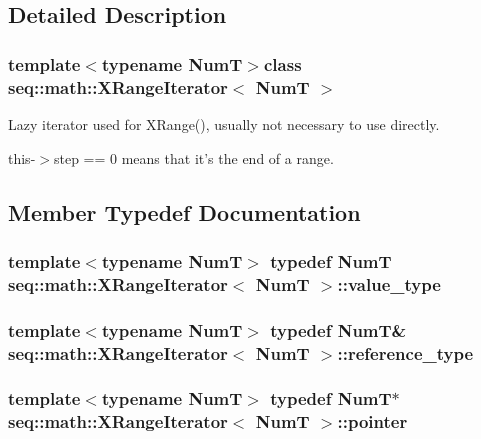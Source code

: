 \subsection{Detailed Description}
\subsubsection*{template$<$typename Num\-T$>$class seq\-::math\-::\-X\-Range\-Iterator$<$ Num\-T $>$}

Lazy iterator used for X\-Range(), usually not necessary to use directly. 

{\ttfamily this-\/$>$step == 0} means that it's the end of a range. 

\subsection{Member Typedef Documentation}
\hypertarget{classseq_1_1math_1_1_x_range_iterator_a18b93b3a4ea6128dedb3668b35814bf0}{
\subsubsection[{value\-\_\-type}]{\setlength{\rightskip}{0pt plus 5cm}template$<$typename Num\-T$>$ typedef Num\-T {\bf seq\-::math\-::\-X\-Range\-Iterator}$<$ Num\-T $>$\-::{\bf value\-\_\-type}}}\label{classseq_1_1math_1_1_x_range_iterator_a18b93b3a4ea6128dedb3668b35814bf0}
\hypertarget{classseq_1_1math_1_1_x_range_iterator_a0bb59d21d7807cd3c0f354d4657ce543}{
\subsubsection[{reference\-\_\-type}]{\setlength{\rightskip}{0pt plus 5cm}template$<$typename Num\-T$>$ typedef Num\-T\& {\bf seq\-::math\-::\-X\-Range\-Iterator}$<$ Num\-T $>$\-::{\bf reference\-\_\-type}}}\label{classseq_1_1math_1_1_x_range_iterator_a0bb59d21d7807cd3c0f354d4657ce543}
\hypertarget{classseq_1_1math_1_1_x_range_iterator_a594e9803c20ec88fc489fc70e61b13a2}{
\subsubsection[{pointer}]{\setlength{\rightskip}{0pt plus 5cm}template$<$typename Num\-T$>$ typedef Num\-T$\ast$ {\bf seq\-::math\-::\-X\-Range\-Iterator}$<$ Num\-T $>$\-::{\bf pointer}}}\label{classseq_1_1math_1_1_x_range_iterator_a594e9803c20ec88fc489fc70e61b13a2}
